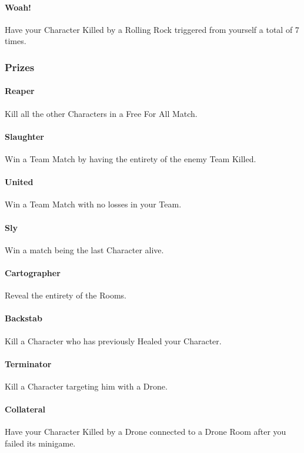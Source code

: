 \paragraph{Woah!} Have your Character Killed by a Rolling Rock triggered from yourself a total of 7 times.

\subsubsection{Prizes}

\paragraph{Reaper} Kill all the other Characters in a Free For All Match.
\paragraph{Slaughter} Win a Team Match by having the entirety of the enemy Team Killed.
\paragraph{United} Win a Team Match with no losses in your Team.
\paragraph{Sly} Win a match being the last Character alive.
\paragraph{Cartographer} Reveal the entirety of the Rooms.
\paragraph{Backstab} Kill a Character who has previously Healed your Character.

\paragraph{Terminator} Kill a Character targeting him with a Drone.
\paragraph{Collateral} Have your Character Killed by a Drone connected to a Drone Room after you failed its minigame.


\pagebreak 